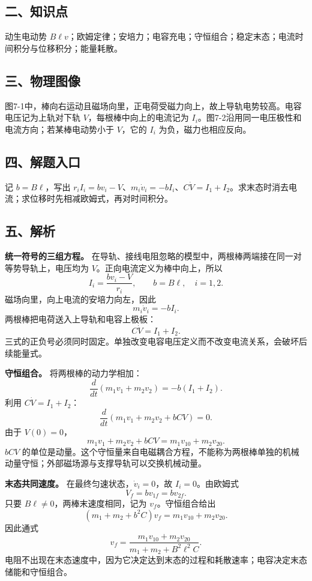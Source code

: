 \documentclass[12pt,a4paper,UTF8]{ctexart}
\begin{document}
\subsection{二、知识点}\label{ux4e8cux77e5ux8bc6ux70b9-6}

动生电动势
\(B\ell v\)；欧姆定律；安培力；电容充电；守恒组合；稳定末态；电流时间积分与位移积分；能量耗散。

\subsection{三、物理图像}\label{ux4e09ux7269ux7406ux56feux50cf-6}

图7-1中，棒向右运动且磁场向里，正电荷受磁力向上，故上导轨电势较高。电容电压记为上轨对下轨
\(V\)，每根棒中向上的电流记为
\(I_i\)。图7-2沿用同一电压极性和电流方向；若某棒电动势小于 \(V\)，它的
\(I_i\) 为负，磁力也相应反向。

\subsection{四、解题入口}\label{ux56dbux89e3ux9898ux5165ux53e3-6}

记 \(b=B\ell\)，写出
\(r_iI_i=bv_i-V\)、\(m_i\dot v_i=-bI_i\)、\(C\dot V=I_1+I_2\)。求末态时消去电流；求位移时先相减欧姆式，再对时间积分。

\subsection{五、解析}\label{ux4e94ux89e3ux6790-6}

\textbf{统一符号的三组方程。}
在导轨、接线电阻忽略的模型中，两根棒两端接在同一对等势导轨上，电压均为
\(V\)。正向电流定义为棒中向上，所以 \[
\boxed{I_i=\frac{bv_i-V}{r_i}},
\qquad b=B\ell,\quad i=1,2.
\] 磁场向里，向上电流的安培力向左，因此 \[
\boxed{m_i\dot v_i=-bI_i}.
\] 两根棒把电荷送入上导轨和电容上极板： \[
\boxed{C\dot V=I_1+I_2}.
\]
三式的正负号必须同时固定。单独改变电容电压定义而不改变电流关系，会破坏后续能量式。

\textbf{守恒组合。} 将两根棒的动力学相加： \[
\frac{d}{dt}(m_1v_1+m_2v_2)=-b(I_1+I_2).
\] 利用 \(C\dot V=I_1+I_2\)： \[
\frac{d}{dt}(m_1v_1+m_2v_2+bCV)=0.
\] 由于 \(V(0)=0\)， \[
\boxed{m_1v_1+m_2v_2+bCV
=m_1v_{10}+m_2v_{20}}.
\] \(bCV\)
的单位是动量。这个守恒量来自电磁耦合方程，不能称为两根棒单独的机械动量守恒；外部磁场源与支撑导轨可以交换机械动量。

\textbf{末态共同速度。} 在最终匀速状态，\(\dot v_i=0\)，故
\(I_i=0\)。由欧姆式 \[
V_f=bv_{1f}=bv_{2f}.
\] 只要 \(B\ell\ne0\)，两棒末速度相同，记为 \(v_f\)。守恒组合给出 \[
(m_1+m_2+b^2C)v_f=m_1v_{10}+m_2v_{20}.
\] 因此通式 \[
\boxed{v_f=
\frac{m_1v_{10}+m_2v_{20}}{m_1+m_2+B^2\ell^2C}}.
\]
电阻不出现在末态速度中，因为它决定达到末态的过程和耗散速率；电容决定末态储能和守恒组合。
\end{document}
